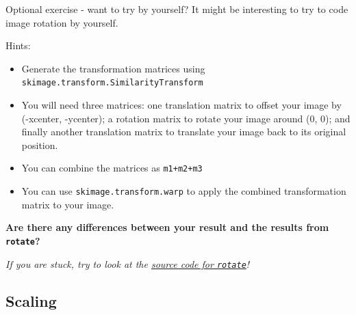 \documentclass[9pt, aspectratio=169]{beamer}
\begin{document}
\begin{frame}
    {Optional exercise - want to try by yourself?}
    It might be interesting to try to code image rotation by yourself.

    Hints:

    \begin{itemize}
        \item Generate the transformation matrices using \texttt{skimage.transform.SimilarityTransform}
        \item You will need three matrices: one translation matrix to offset your image by (-xcenter, -ycenter); a rotation matrix to rotate your image around (0, 0); and finally another translation matrix to translate your image back to its original position.
        \item You can combine the matrices as \texttt{m1+m2+m3}
        \item You can use \texttt{skimage.transform.warp} to apply the combined transformation matrix to your image.
    \end{itemize}

    \textbf{Are there any differences between your result and the results from \texttt{rotate}?}

    \textit{If you are stuck, try to look at the \href{https://github.com/scikit-image/scikit-image/blob/main/skimage/transform/\_warps.py\#L349-L460}{\underline{source code for \texttt{rotate}}}!}
\end{frame}

\subsection{Scaling}
\end{document}
